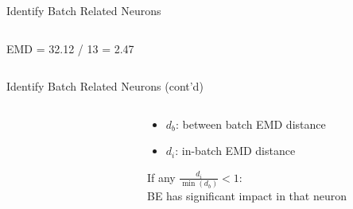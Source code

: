\documentclass{beamer}
\begin{document}
\begin{frame}{Identify Batch Related Neurons}
\begin{columns}
\begin{column}[t]{.48\textwidth}
\begin{figure}[ht]
        \caption*{\label{fig:earth-points} }
      \end{figure}
      \vspace{-1.5cm}
      \begin{table}[]
      \end{table}
      EMD = 32.12 / 13 = 2.47
    \end{column}
  \end{columns}
\end{frame}
\begin{frame}{Identify Batch Related Neurons (cont'd)}
  \begin{columns}
    \begin{column}[t]{.38\textwidth}
      \begin{figure}[ht]
        \centering
        
        \caption*{\label{fig:emd-batch}}
      \end{figure}
    \end{column}
    \begin{column}[t]{.58\textwidth}
      \begin{itemize}
        \item $d_{b}$: between batch EMD distance
        \item $d_{i}$: in-batch EMD distance
      \end{itemize}
      \vspace{1cm}
      \quad If any $\frac{d_{i}}{\min{(d_{b})}} < 1$:\\
      \vspace{0.3cm} \quad BE has  significant  impact in that neuron
    \end{column}
  \end{columns}
\end{frame}
\end{document}
